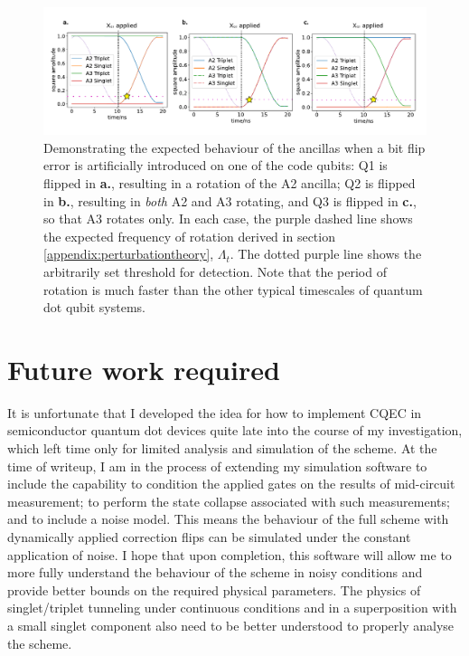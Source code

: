 \documentclass{report}
\begin{document}
\begin{figure}[ht]
    \centering
    \includegraphics[scale = 0.87]{Figures/flips.pdf}
    \caption{Demonstrating the expected behaviour of the ancillas when a bit flip error is artificially introduced on one of the code qubits: Q1 is flipped in \textbf{a.}, resulting in a rotation of the A2 ancilla; Q2 is flipped in \textbf{b.}, resulting in \textit{both} A2 and A3 rotating, and Q3 is flipped in \textbf{c.}, so that A3 rotates only. In each case, the purple dashed line shows the expected frequency of rotation derived in section \ref{appendix:perturbationtheory}, $\Lambda_t$. The dotted purple line shows the arbitrarily set threshold for detection. Note that the period of rotation is much faster than the other typical timescales of quantum dot qubit systems.
    }\label{fig:afterflip}
\end{figure}

\section{Future work required}
It is unfortunate that I developed the idea for how to implement CQEC in semiconductor quantum dot devices quite late into the course of my investigation, which left time only for limited analysis and simulation of the scheme. At the time of writeup, I am in the process of extending my simulation software to include the capability to condition the applied gates on the results of mid-circuit measurement; to perform the state collapse associated with such measurements; and to include a noise model. This means the behaviour of the full scheme with dynamically applied correction flips can be simulated under the constant application of noise. I hope that upon completion, this software will allow me to more fully understand the behaviour of the scheme in noisy conditions and provide better bounds on the required physical parameters. The physics of singlet/triplet tunneling under continuous conditions and in a superposition with a small singlet component also need to be better understood to properly analyse the scheme.
\end{document}
